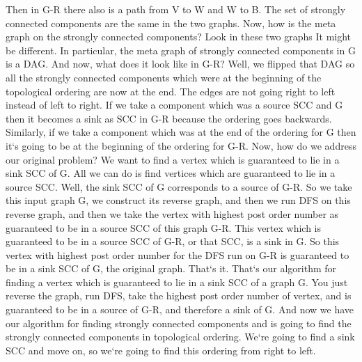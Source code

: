 Then in G-R there also is a path from V to W and W to B\@.
The set of strongly connected components are the same in the two graphs.
Now, how is the meta graph on the strongly connected components? Look in these two graphs It might be different.
In particular, the meta graph of strongly connected components in G is a DAG\@.
And now, what does it look like in G-R? Well, we flipped that DAG so all the strongly connected components which were at the beginning of the topological ordering are now at the end.
The edges are not going right to left instead of left to right.
If we take a component which was a source SCC and G then it becomes a sink as SCC in G-R because the ordering goes backwards.
Similarly, if we take a component which was at the end of the ordering for G then it`s going to be at the beginning of the ordering for G-R\@.
Now, how do we address our original problem? We want to find a vertex which is guaranteed to lie in a sink SCC of G\@.
All we can do is find vertices which are guaranteed to lie in a source SCC\@.
Well, the sink SCC of G corresponds to a source of G-R\@.
So we take this input graph G, we construct its reverse graph, and then we run DFS on this reverse graph, and then we take the vertex with highest post order number as guaranteed to be in a source SCC of this graph G-R\@.
This vertex which is guaranteed to be in a source SCC of G-R, or that SCC, is a sink in G\@.
So this vertex with highest post order number for the DFS run on G-R is guaranteed to be in a sink SCC of G, the original graph.
That`s it.
That`s our algorithm for finding a vertex which is guaranteed to lie in a sink SCC of a graph G\@.
You just reverse the graph, run DFS, take the highest post order number of vertex, and is guaranteed to be in a source of G-R, and therefore a sink of G\@.
And now we have our algorithm for finding strongly connected components and is going to find the strongly connected components in topological ordering.
We`re going to find a sink SCC and move on, so we`re going to find this ordering from right to left.

